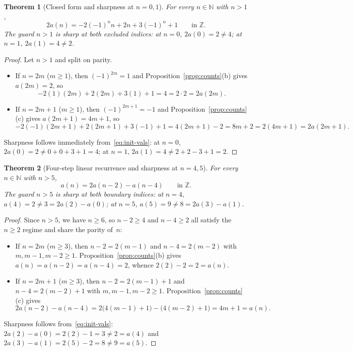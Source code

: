 \documentclass[11pt]{article}
\newtheorem{theorem}{Theorem}[section]
\theoremstyle{definition}
\newcommand{\N}{\mathbb{N}}
\newcommand{\Z}{\mathbb{Z}}
\begin{document}
\begin{theorem}[Closed form and sharpness at $n = 0, 1$]
\label{thm:closed-form}
For every $n \in \N$ with $n > 1$,
\[
2 a(n) = -2(-1)^n n + 2n + 3(-1)^n + 1 \qquad \text{in }\Z.
\]
The guard $n > 1$ is sharp at both excluded indices: at $n = 0$, $2a(0) = 2 \ne 4$; at $n = 1$, $2a(1) = 4 \ne 2$.
\end{theorem}

\begin{proof}
Let $n > 1$ and split on parity.
\begin{itemize}
\item If $n = 2m$ ($m \ge 1$), then $(-1)^{2m} = 1$ and Proposition~\ref{prop:counts}(b) gives $a(2m) = 2$, so
\[
-2(1)(2m) + 2(2m) + 3(1) + 1 = 4 = 2 \cdot 2 = 2a(2m).
\]
\item If $n = 2m + 1$ ($m \ge 1$), then $(-1)^{2m+1} = -1$ and Proposition~\ref{prop:counts}(c) gives $a(2m + 1) = 4m + 1$, so
\[
-2(-1)(2m + 1) + 2(2m + 1) + 3(-1) + 1 = 4(2m + 1) - 2 = 8m + 2 = 2(4m + 1) = 2a(2m + 1).
\]
\end{itemize}
Sharpness follows immediately from~\eqref{eq:init-vals}: at $n = 0$, $2a(0) = 2 \ne 0 + 0 + 3 + 1 = 4$; at $n = 1$, $2a(1) = 4 \ne 2 + 2 - 3 + 1 = 2$.
\end{proof}

\begin{theorem}[Four-step linear recurrence and sharpness at $n = 4, 5$]
\label{thm:recurrence}
For every $n \in \N$ with $n > 5$,
\[
a(n) = 2a(n - 2) - a(n - 4) \qquad \text{in }\Z.
\]
The guard $n > 5$ is sharp at both boundary indices: at $n = 4$, $a(4) = 2 \ne 3 = 2a(2) - a(0)$; at $n = 5$, $a(5) = 9 \ne 8 = 2a(3) - a(1)$.
\end{theorem}

\begin{proof}
Since $n > 5$, we have $n \ge 6$, so $n - 2 \ge 4$ and $n - 4 \ge 2$ all satisfy the $n \ge 2$ regime and share the parity of~$n$:
\begin{itemize}
\item If $n = 2m$ ($m \ge 3$), then $n - 2 = 2(m - 1)$ and $n - 4 = 2(m - 2)$ with $m, m - 1, m - 2 \ge 1$. Proposition~\ref{prop:counts}(b) gives $a(n) = a(n - 2) = a(n - 4) = 2$, whence $2(2) - 2 = 2 = a(n)$.
\item If $n = 2m + 1$ ($m \ge 3$), then $n - 2 = 2(m - 1) + 1$ and $n - 4 = 2(m - 2) + 1$ with $m, m - 1, m - 2 \ge 1$. Proposition~\ref{prop:counts}(c) gives
\[
2a(n - 2) - a(n - 4) = 2\bigl(4(m - 1) + 1\bigr) - \bigl(4(m - 2) + 1\bigr) = 4m + 1 = a(n).
\]
\end{itemize}
Sharpness follows from~\eqref{eq:init-vals}: $2a(2) - a(0) = 2(2) - 1 = 3 \ne 2 = a(4)$ and $2a(3) - a(1) = 2(5) - 2 = 8 \ne 9 = a(5)$.
\end{proof}
\end{document}
